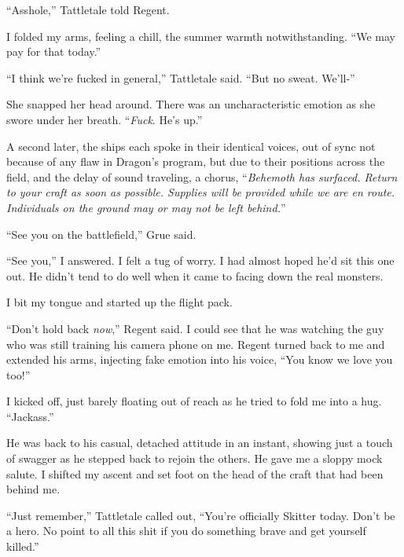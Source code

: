 ``Asshole,'' Tattletale told Regent.



I folded my arms, feeling a chill, the summer warmth notwithstanding.  ``We may pay for that today.''



``I think we're fucked in general,'' Tattletale said.  ``But no sweat.  We'll-''



She snapped her head around.  There was an uncharacteristic emotion as she swore under her breath.  ``\emph{Fuck}.  He's up.''



A second later, the ships each spoke in their identical voices, out of sync not because of any flaw in Dragon's program, but due to their positions across the field, and the delay of sound traveling, a chorus, ``\emph{Behemoth has surfaced.  Return to your craft as soon as possible.  Supplies will be provided while we are en route.  Individuals on the ground may or may not be left behind.}''



``See you on the battlefield,'' Grue said.



``See you,'' I answered.  I felt a tug of worry.  I had almost hoped he'd sit this one out.  He didn't tend to do well when it came to facing down the real monsters.



I bit my tongue and started up the flight pack.



``Don't hold back \emph{now},'' Regent said.  I could see that he was watching the guy who was still training his camera phone on me.  Regent turned back to me and extended his arms, injecting fake emotion into his voice, ``You know we love you too!''



I kicked off, just barely floating out of reach as he tried to fold me into a hug.  ``Jackass.''



He was back to his casual, detached attitude in an instant, showing just a touch of swagger as he stepped back to rejoin the others.  He gave me a sloppy mock salute.  I shifted my ascent and set foot on the head of the craft that had been behind me.



``Just remember,'' Tattletale called out, ``You're officially Skitter today.  Don't be a hero.  No point to all this shit if you do something brave and get yourself killed.''



